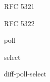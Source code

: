 \begin{thebibliography}{1}

\begin{flushleft}
RFC 5321
\end{flushleft}

\begin{flushleft}
RFC 5322
\end{flushleft}

\begin{flushleft}
poll
\end{flushleft}

\begin{flushleft}
select
\end{flushleft}

\begin{flushleft}
diff-poll-select
\end{flushleft}

\end{thebibliography}
